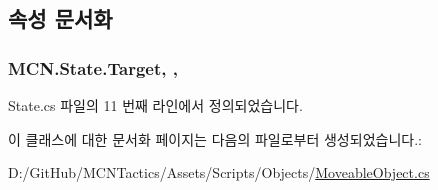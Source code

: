 \subsection{속성 문서화}
\subsubsection[{\texorpdfstring{Target}{Target}}]{ M\+C\+N.\+State.\+Target\hspace{0.3cm}{\ttfamily [get]}, {\ttfamily [protected]}, {\ttfamily [inherited]}}\hypertarget{class_m_c_n_1_1_state_a79a563b32f183c9adc9a96679fc57eb8}{}\label{class_m_c_n_1_1_state_a79a563b32f183c9adc9a96679fc57eb8}


State.\+cs 파일의 11 번째 라인에서 정의되었습니다.



이 클래스에 대한 문서화 페이지는 다음의 파일로부터 생성되었습니다.\+:\begin{DoxyCompactItemize}
\item 
D\+:/\+Git\+Hub/\+M\+C\+N\+Tactics/\+Assets/\+Scripts/\+Objects/\hyperlink{_moveable_object_8cs}{Moveable\+Object.\+cs}\end{DoxyCompactItemize}

